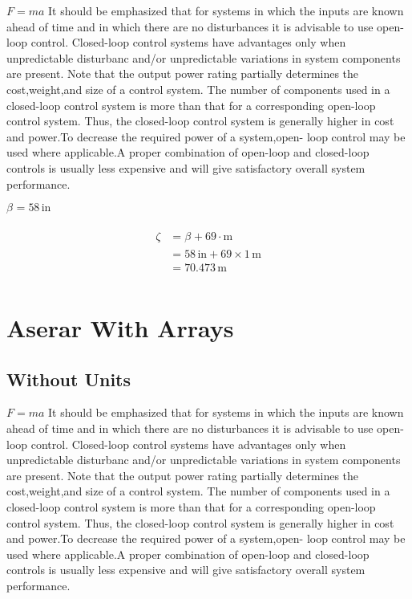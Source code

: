 \documentclass{report}
\begin{document}
$F = ma$ It should be emphasized that for systems in which the inputs are known ahead of time and in which there are no disturbances it is advisable to use open-loop control.  Closed-loop control systems have advantages only when unpredictable disturbanc  and/or unpredictable variations in system components are present. Note that the  output power rating partially determines the cost,weight,and size of a control system.  The number of components used in a closed-loop control system is more than that for  a corresponding open-loop control system. Thus, the closed-loop control system is generally higher in cost and power.To decrease the required power of a system,open-  loop control may be used where applicable.A proper combination of open-loop and  closed-loop controls is usually less expensive and will give satisfactory overall system  performance.

$\beta_{} = 58\,\mathrm{in}$ 

\begin{align}
\begin{split}
\zeta	&= \beta_{} + 69 \cdot \mathrm{m}\\
		&= 58\,\mathrm{in} + 69 \times 1\,\mathrm{m}\\
		&= 70.473\,\mathrm{m}\\
\end{split}
\end{align}

\chapter{Aserar With Arrays}
\section{Without Units}

$F = ma$ It should be emphasized that for systems in which the inputs are known ahead of time and in which there are no disturbances it is advisable to use open-loop control.  Closed-loop control systems have advantages only when unpredictable disturbanc  and/or unpredictable variations in system components are present. Note that the  output power rating partially determines the cost,weight,and size of a control system.  The number of components used in a closed-loop control system is more than that for  a corresponding open-loop control system. Thus, the closed-loop control system is generally higher in cost and power.To decrease the required power of a system,open-  loop control may be used where applicable.A proper combination of open-loop and  closed-loop controls is usually less expensive and will give satisfactory overall system  performance.
\end{document}
